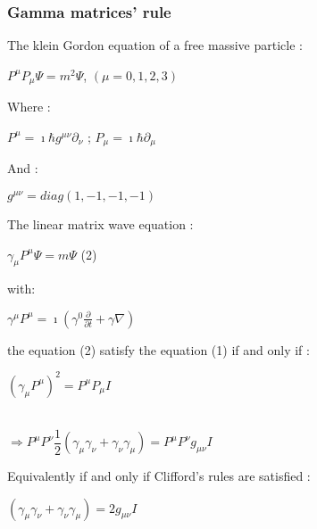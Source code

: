 \begin{frame}[allowframebreaks]
 \frametitle{Gamma matrices' rule}
\begin{itemize}
\item The klein Gordon equation of a free massive particle :
  \begin{center}
    $P^\mu P_\mu \Psi = m^2 \Psi$, \qquad  $(\mu=0,1,2,3)$
  \end{center}
  Where :
  \begin{center}
    $P^\mu = \imath \hbar g^{\mu\nu} \partial_\nu $  \qquad; \quad $P_\mu = \imath \hbar \partial_\mu$
  \end{center}
  And :
  \begin{center}
    $g^{\mu\nu}= diag(1,-1,-1,-1)$   
  \end{center}
  \item The linear matrix wave equation :
  \begin{center}
    $\gamma_\mu P^\mu \Psi= m\Psi$   \qquad (2)
  \end{center}
  with:
  \begin{center}
    $\gamma^\mu P^\mu = \imath (\gamma^0 \frac{\partial}{\partial t} +\gamma \nabla)$\\
  \end{center}
  the equation (2) satisfy the equation (1) if and only if :
  \begin{center}
    $ (\gamma_\mu P^\mu)^2=P^\mu P_\mu I$  \\
  \end{center}
  \begin{center}
  \\  $\Longrightarrow P^\mu P^\nu \dfrac{1}{2}(\gamma_\mu \gamma_\nu +\gamma_\nu \gamma_\mu )=P^\mu P^\nu g_{\mu\nu} I$
  \end{center}
  Equivalently if and only if Clifford's rules are satisfied :
  \begin{center}
  \item  $(\gamma_\mu \gamma_\nu +\gamma_\nu \gamma_\mu )=2 g_{\mu\nu} I$
  \end{center}
\end{itemize}

\end{frame}
